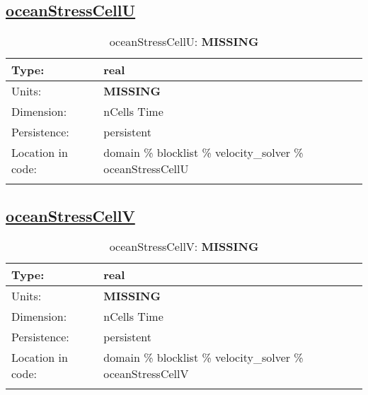 \subsection[oceanStressCellU]{\hyperref[sec:var_tab_velocity_solver]{oceanStressCellU}}
\label{subsec:var_sec_velocity_solver_oceanStressCellU}
\begin{center}
\begin{longtable}{| p{2.0in} | p{4.0in} |}
        \hline 
        Type: & real \\
        \hline 
        Units: & {\bf \color{red} MISSING} \\
        \hline 
        Dimension: & nCells Time \\
        \hline 
        Persistence: & persistent \\
        \hline 
         Location in code: & domain \% blocklist \% velocity\_solver \% oceanStressCellU \\
         \hline 
    \caption{oceanStressCellU: {\bf \color{red} MISSING}}
\end{longtable}
\end{center}
\subsection[oceanStressCellV]{\hyperref[sec:var_tab_velocity_solver]{oceanStressCellV}}
\label{subsec:var_sec_velocity_solver_oceanStressCellV}
\begin{center}
\begin{longtable}{| p{2.0in} | p{4.0in} |}
        \hline 
        Type: & real \\
        \hline 
        Units: & {\bf \color{red} MISSING} \\
        \hline 
        Dimension: & nCells Time \\
        \hline 
        Persistence: & persistent \\
        \hline 
         Location in code: & domain \% blocklist \% velocity\_solver \% oceanStressCellV \\
         \hline 
    \caption{oceanStressCellV: {\bf \color{red} MISSING}}
\end{longtable}
\end{center}
